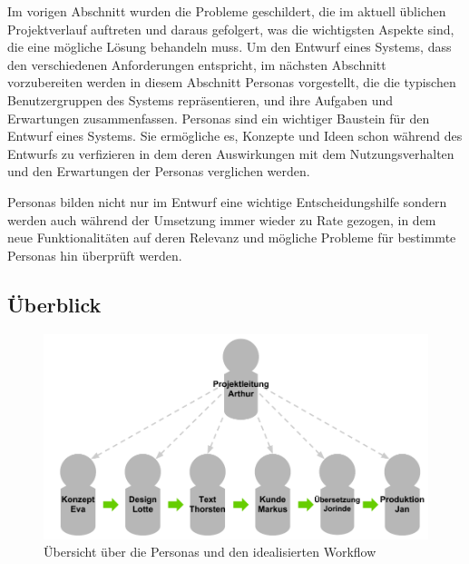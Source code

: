 Im vorigen Abschnitt wurden die Probleme geschildert, die im aktuell üblichen Projektverlauf auftreten und daraus gefolgert, was die wichtigsten Aspekte sind, die eine mögliche Lösung behandeln muss. Um den Entwurf eines Systems, dass den verschiedenen Anforderungen entspricht, im nächsten Abschnitt vorzubereiten werden in diesem Abschnitt Personas vorgestellt, die die typischen Benutzergruppen des Systems repräsentieren, und ihre Aufgaben und Erwartungen zusammenfassen. Personas sind ein wichtiger Baustein für den Entwurf eines Systems. Sie ermögliche es, Konzepte und Ideen schon während des Entwurfs zu verfizieren in dem deren Auswirkungen mit dem Nutzungsverhalten und den Erwartungen der Personas verglichen werden.

\begin{quote}
 \cite[S.15 ff.]{brown2007communicating}
\end{quote}

Personas bilden nicht nur im Entwurf eine wichtige Entscheidungshilfe sondern werden auch während der Umsetzung immer wieder zu Rate gezogen, in dem neue Funktionalitäten auf deren Relevanz und mögliche Probleme für bestimmte Personas hin überprüft werden. \cite[S.38 ff.]{cohn2004user}

\subsection{Überblick}

\begin{figure}[htb]
\begin{center}
\includegraphics[width=\textwidth]{media/Uebersicht-Personas.pdf}
\caption{Übersicht über die Personas und den idealisierten Workflow}
\label{chart:uebersicht-personas}
\end{center}
\end{figure}

